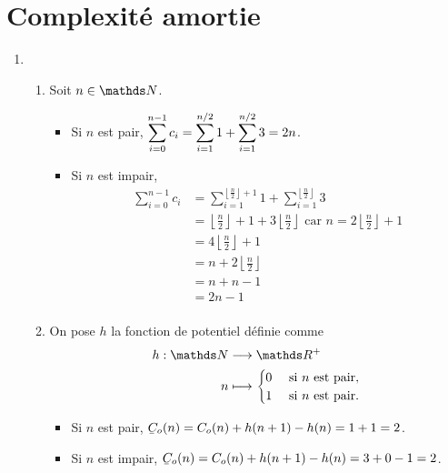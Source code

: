 \section{Complexité amortie}

\begin{enumerate}
	\item
		\begin{enumerate}
			\item Soit $n \in \N$.
				\begin{itemize}
					\item Si $n$\/ est pair, \hfill$\displaystyle\sum_{i=0}^{n-1} c_i = \sum_{i=1}^{n/2} 1 + \sum_{i=1}^{n / 2} 3 = 2n$.\hfill\null
					\item Si $n$ est impair,
						\begin{align*}
							\sum_{i=0}^{n-1} c_i &= \sum_{i = 1}^{\left\lfloor \frac{n}{2} \right\rfloor + 1} 1 + \sum_{i=1}^{\left\lfloor \frac{n}{2} \right\rfloor} 3\\
							&= \left\lfloor \frac{n}{2} \right\rfloor + 1 + 3 \left\lfloor \frac{n}{2} \right\rfloor \text{ car } n = 2\left\lfloor \frac{n}{2} \right\rfloor + 1 \\
							&= 4 \left\lfloor \frac{n}{2} \right\rfloor + 1 \\
							&= n + 2 \left\lfloor \frac{n}{2} \right\rfloor \\
							&= n + n - 1 \\
							&= 2n - 1 \\
						\end{align*}
				\end{itemize}
			\item On pose $h$\/ la fonction de potentiel définie comme \begin{align*}
					h: \N &\longrightarrow \R^+ \\
					n & \longmapsto \begin{cases}
						0 & \text{ si $n$ est pair},\\
						1 & \text{ si $n$ est pair}.
					\end{cases}
				\end{align*}
				\begin{itemize}
					\item Si $n$\/ est pair, \hfill $\ds\ubar{C}_o(n) = C_o(n) + h(n+1) - h(n) = 1 + 1 = 2$.\hfill\null
					\item Si $n$\/ est impair, \hfill $\ds \ubar{C}_o(n) = C_o(n) + h(n+1) - h(n) = 3 + 0 - 1 = 2$.\hfill\null
				\end{itemize}
		\end{enumerate}
\end{enumerate}
